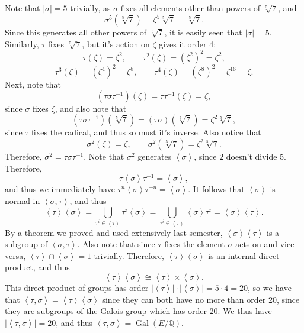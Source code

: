 \documentclass[11pt, letterpaper]{article}
\begin{document}
Note that $\left| \sigma  \right| =5$ trivially, as $\sigma $ fixes all elements other than powers of $\sqrt[5]{7} $, and
\[
	\sigma ^5(\sqrt[5]{7} )=\zeta ^5\sqrt[5]{7} =\sqrt[5]{7} 
.\]
Since this generates all other powers of $\sqrt[5]{7} $, it is easily seen that $\left| \sigma  \right| =5$. Similarly, $\tau $ fixes $\sqrt[5]{7} $, but it's action on $\zeta $ gives it order 4:
\[
	\tau (\zeta )=\zeta ^2,\qquad \tau ^2(\zeta )=\left( \zeta ^2 \right) ^2=\zeta ^2,
\]
\[
	\tau ^3(\zeta )=\left( \zeta ^4 \right) ^2=\zeta ^8,\qquad \tau ^4(\zeta )=\left( \zeta ^8 \right) ^2=\zeta ^{16} =\zeta 
.\]
Next, note that
\[
	\left( \tau \sigma \tau ^{-1}  \right) (\zeta )=\tau \tau ^{-1} (\zeta )=\zeta ,
\]
since $\sigma $ fixes $\zeta $, and also note that
\[
	(\tau \sigma \tau ^{-1} )\left( \sqrt[5]{7}  \right) =(\tau \sigma )\left( \sqrt[5]{7}  \right) =\zeta ^2\sqrt[5]{7} ,
\]
since $\tau $ fixes the radical, and thus so must it's inverse. Also notice that
\[
	\sigma ^2(\zeta )=\zeta ,\qquad \sigma ^2\left( \sqrt[5]{7}  \right) =\zeta ^2\sqrt[5]{7} 
.\]
Therefore, $\sigma ^2=\tau \sigma \tau ^{-1} $. Note that $\sigma ^2$ generates $\left\langle \sigma  \right\rangle $, since $2$ doesn't divide 5. Therefore,
\[
	\tau \left\langle \sigma  \right\rangle \tau ^{-1} =\left\langle \sigma  \right\rangle ,
\]
and thus we immediately have $\tau ^n \left\langle \sigma  \right\rangle \tau ^{-n} =\left\langle \sigma  \right\rangle $. It follows that $\left\langle \sigma  \right\rangle $ is normal in $\left\langle \sigma ,\tau  \right\rangle $, and thus
\[
	\left\langle \tau  \right\rangle \left\langle \sigma  \right\rangle =\bigcup_{\tau^i \in \left\langle \tau  \right\rangle } \tau ^i \left\langle \sigma  \right\rangle =\bigcup_{\tau ^i\in \left\langle \tau  \right\rangle } \left\langle \sigma  \right\rangle \tau ^{i} =\left\langle \sigma  \right\rangle \left\langle \tau  \right\rangle 
.\]
By a theorem we proved and used extensively last semester, $\left\langle \sigma  \right\rangle \left\langle \tau  \right\rangle $ is a subgroup of $\left\langle \sigma ,\tau  \right\rangle $. Also note that since $\tau $ fixes the element $\sigma $ acts on and vice versa, $\left\langle \tau  \right\rangle \cap \left\langle \sigma  \right\rangle =1$ trivially. Therefore, $\left\langle \tau  \right\rangle \left\langle \sigma  \right\rangle $ is an internal direct product, and thus
\[
	\left\langle \tau  \right\rangle \left\langle \sigma  \right\rangle \cong \left\langle \tau  \right\rangle \times \left\langle \sigma  \right\rangle 
.\]
This direct product of groups has order $\left| \left\langle \tau  \right\rangle  \right| \cdot \left| \left\langle \sigma  \right\rangle  \right| =5\cdot 4=20$, so we have that $\left\langle \tau ,\sigma  \right\rangle =\left\langle \tau  \right\rangle \left\langle \sigma  \right\rangle $ since they can both have no more than order 20, since they are subgroups of the Galois group which has order 20. We thus have $\left| \left\langle \tau ,\sigma  \right\rangle  \right| =20$, and thus $\left\langle \tau ,\sigma  \right\rangle =\operatorname{Gal} (E/\mathbb{Q} )$.
\end{document}
